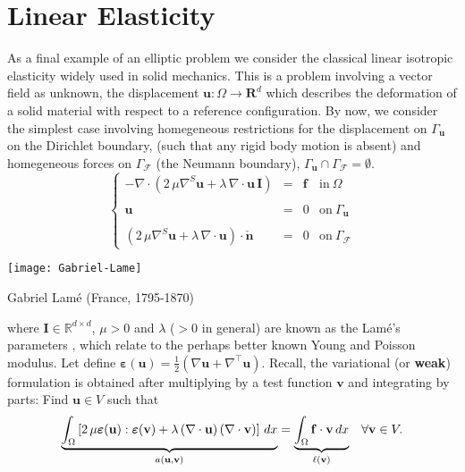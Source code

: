 \section{Linear Elasticity} 

As a final example of an elliptic problem we consider the classical
linear isotropic elasticity widely used in solid mechanics.
This is a problem involving a vector field as unknown,
the displacement $\mathbf{u}: \Omega \rightarrow \mathbf{R}^d$
which describes the deformation of a solid material with
respect to a reference configuration.
By now, we consider the simplest case involving
homegeneous restrictions for the displacement on $\Gamma_{\mathbf{u}}$
on the Dirichlet boundary,
(such that any rigid body motion is absent)
and homegeneous forces on $\Gamma_{\boldsymbol{\mathcal{F}}}$
(the Neumann boundary),
$\Gamma_{\mathbf{u}} \cap \Gamma_{\boldsymbol{\mathcal{F}}} = \emptyset$.
\begin{equation}
\left \{
\begin{array}{rcll}
-\nabla \cdot \left ( 2\,\mu \nabla^S{\mathbf{u}} + \lambda \, \nabla\cdot\mathbf{u} \, \mathbf{I}\right) & = & \mathbf{f} & \mbox{in}~\Omega \\
& & & \\
\mathbf{u} & = & 0 & \mbox{on}~\Gamma_{\mathbf{u}} \\
& & & \\
(2\,\mu \nabla^S{\mathbf{u}} + \lambda \, \nabla\cdot\mathbf{u})\cdot \check{\mathbf{n}} & = & 0 & \mbox{on}~\Gamma_{\boldsymbol{\mathcal{F}}}
\end{array}
\right.
\end{equation}
\begin{marginfigure}[-1.0cm]
	\texttt{[image: Gabriel-Lame]}
	\caption[]{Gabriel Lam\'e (France, 1795-1870)}
\end{marginfigure}
where $\mathbf{I} \in \mathbb{R}^{d \times d}$, $\mu > 0 $ and $\lambda$ ($> 0$ in general)
are known as the Lam\'e's parameters , which relate to the perhaps better known Young and
Poisson modulus. Let define
$\boldsymbol{\varepsilon}(\mathbf{u}) = \frac{1}{2}\left ( \nabla{\mathbf{u}} + \nabla^{\intercal}{\mathbf{u}} \right)$.
Recall, the variational (or \textbf{weak}) formulation is obtained after multiplying by a test function $\mathbf{v}$
and integrating by parts: Find $\mathbf{u} \in V$ such that
\begin{equation}
\begin{array}{ll}
\underbrace{\int_{\Omega}{\left [2\,\mu \boldsymbol{\varepsilon}(\mathbf{u}) : \boldsymbol{\varepsilon}(\mathbf{v})
+ \lambda\, (\nabla \cdot \mathbf{u})\,(\nabla \cdot \mathbf{v}) \right ]\,dx}}_{a(\mathbf{u},\mathbf{v})} =
        \underbrace{\int_{\Omega}{\mathbf{f}\cdot \mathbf{v}}\,dx}_{\ell(\mathbf{v})} & \forall \mathbf{v} \in V. \labeq{elastbasicag}
\end{array}
\end{equation}

